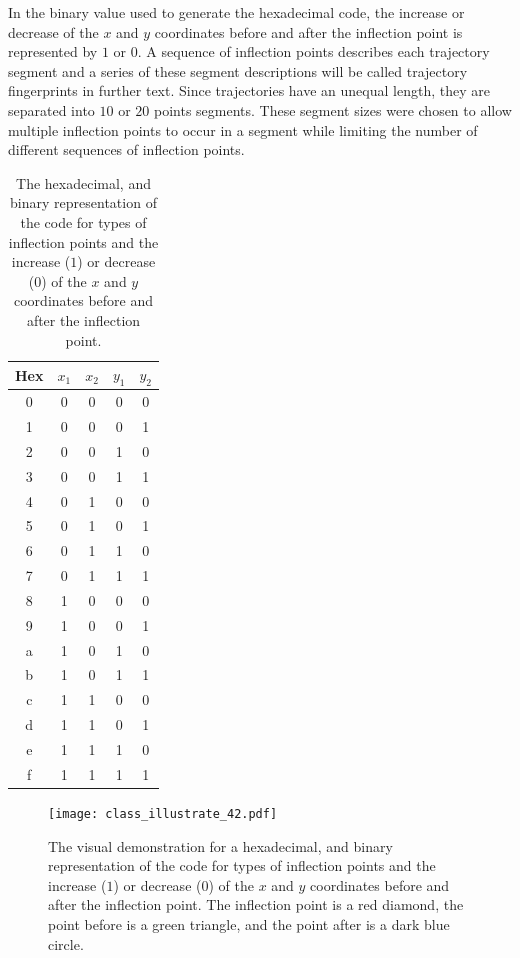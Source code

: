 \documentclass[preprint,12pt]{elsarticle}
\begin{document}
In the binary value used to generate the hexadecimal code, the increase or decrease of the $x$ and $y$ coordinates before and after the inflection point is represented by $1$ or $0$. A sequence of inflection points describes each trajectory segment and a series of these segment descriptions will be called trajectory fingerprints in further text. Since trajectories have an unequal length, they are separated into $10$ or $20$ points segments. These segment sizes were chosen to allow multiple inflection points to occur in a segment while limiting the number of different sequences of inflection points. 

\begin{table}[!ht]
    \centering
    \begin{tabular}{|c|c|c|c|c|}
        \hline
        Hex & $x_{1}$ & $x_{2}$ & $y_{1}$ & $y_{2}$ \\ \hline
        \rowcolor{yellow} 0 & 0 & 0 & 0 & 0 \\ \hline
        1 & 0 & 0 & 0 & 1 \\ \hline
        2 & 0 & 0 & 1 & 0 \\ \hline
        \rowcolor{yellow} 3 & 0 & 0 & 1 & 1 \\ \hline
        4 & 0 & 1 & 0 & 0 \\ \hline 
        5 & 0 & 1 & 0 & 1 \\ \hline
        6 & 0 & 1 & 1 & 0 \\ \hline
        7 & 0 & 1 & 1 & 1 \\ \hline
        8 & 1 & 0 & 0 & 0 \\ \hline
        9 & 1 & 0 & 0 & 1 \\ \hline
        a & 1 & 0 & 1 & 0 \\ \hline
        b & 1 & 0 & 1 & 1 \\ \hline
        \rowcolor{yellow} c & 1 & 1 & 0 & 0 \\ \hline
        d & 1 & 1 & 0 & 1 \\ \hline
        e & 1 & 1 & 1 & 0 \\ \hline
        \rowcolor{yellow} f & 1 & 1 & 1 & 1 \\ \hline
    \end{tabular}
    \caption{The hexadecimal, and binary representation of the code for types of inflection points and the increase ($1$) or decrease ($0$) of the $x$ and $y$ coordinates before and after the inflection point.}
    \label{tab:classes}
\end{table}

\begin{figure}[!ht]
    \centering
    \texttt{[image: class\_illustrate\_42.pdf]}
    \caption{The visual demonstration for a hexadecimal, and binary representation of the code for types of inflection points and the increase ($1$) or decrease ($0$) of the $x$ and $y$ coordinates before and after the inflection point. The inflection point is a red diamond, the point before is a green triangle, and the point after is a dark blue circle.}
    \label{fig:visual_class}
\end{figure}
\end{document}
